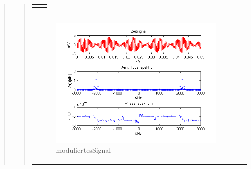 \begin{quote}
\begin{quote}
\begin{center}
\begin{tabular}{ll}
\begin{minipage}{0.67\textwidth}
            \end{minipage}
        
        \end{tabular}
        \end{center}
        
         \begin{center}
        \begin{tabular}{ll}
        
        \hspace{-5cm}
            \begin{minipage}{0.67\textwidth}
                
                \begin{figure}[H]
                    \includegraphics[scale=0.7]{Bilder/Am_Dre_2k_100Hz_mo}
                    \caption{moduliertesSignal}
                    \label{fig:DemodreieckoT}
                \end{figure}
        
            \end{minipage}
        

\end{tabular}
\end{center}
\end{quote}
\end{quote}
